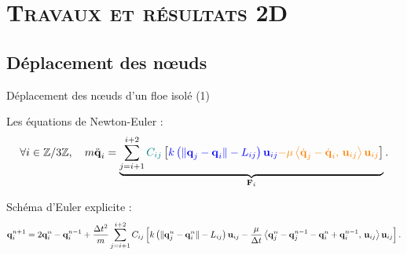 


\section{\textsc{Travaux et résultats 2D}}


\subsection{Déplacement des n\oe{}uds}


\begin{frame}{Déplacement des n\oe{}uds d'un floe isolé (1)}


	\vspace{-0.5cm}
    Les équations de Newton-Euler :
    \begin{align*}
        \forall i \in \mathbb{Z}/3\mathbb{Z}, \quad m \ddot{\bm{\mathrm{q}}}_i = \underbrace{\sum_{j=i+1}^{i+2} \textcolor{teal}{C_{ij}} \left[  \textcolor{blue}{k \left( \Vert \bm{\mathrm{q}}_j - \bm{\mathrm{q}}_i \Vert - L_{ij} \right) \bm{\mathrm{u}}_{ij}} \textcolor{orange}{- \mu \left\langle \dot{\bm{\mathrm{q}}}_j - \dot{\bm{\mathrm{q}}}_i, \, \bm{\mathrm{u}}_{ij}  \right\rangle  \bm{\mathrm{u}}_{ij}}  \right]}_{\bm{\mathrm{F}}_i} . 
    \end{align*}

    Schéma d’Euler explicite :
    \begin{align*}
        \bm{\mathrm{q}}_{i}^{n+1} = 2\bm{\mathrm{q}}_{i}^{n}-\bm{\mathrm{q}}_{i}^{n-1} + \frac{\Delta t^2}{m} \sum_{j=i+1}^{i+2}C_{ij}\left[ k \left( \Vert \bm{\mathrm{q}}_j^n - \bm{\mathrm{q}}_i^n \Vert - L_{ij} \right) \bm{\mathrm{u}}_{ij} - \frac{\mu}{\Delta t} \left\langle \bm{\mathrm{q}}_{j}^{n}-\bm{\mathrm{q}}_{j}^{n-1} - \bm{\mathrm{q}}_{i}^{n}+\bm{\mathrm{q}}_{i}^{n-1}, \, \bm{\mathrm{u}}_{ij} \right\rangle  \bm{\mathrm{u}}_{ij}  \right].
    \end{align*}
    
\end{frame}


